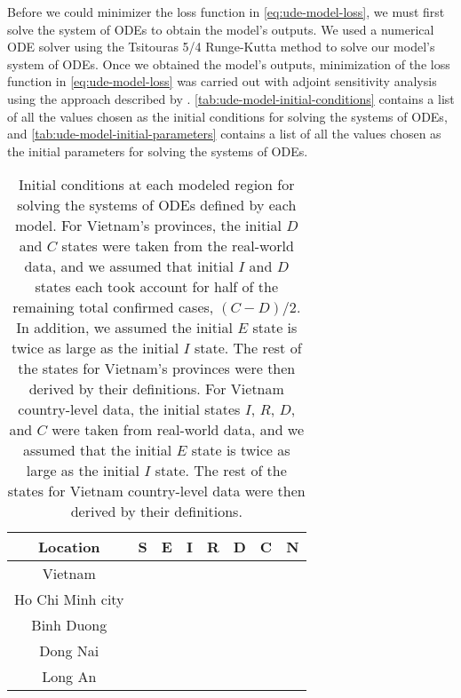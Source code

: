 Before we could minimizer the loss function in \autoref{eq:ude-model-loss}, we must first solve the system of \glspl{ODE} to obtain the model's outputs.
We used a numerical \gls{ODE} solver using the Tsitouras 5/4 Runge-Kutta method \cite{tsitourasRungeKuttaPairs2011} to solve our model's system of \glspl{ODE}.
Once we obtained the model's outputs, minimization of the loss function in \autoref{eq:ude-model-loss} was carried out with adjoint sensitivity analysis \cite{maComparisonAutomaticDifferentiation2021} using the approach described by \citeauthor{rackauckasUniversalDifferentialEquations2020} \cite{rackauckasUniversalDifferentialEquations2020}.
\autoref{tab:ude-model-initial-conditions} contains a list of all the values chosen as the initial conditions for solving the systems of \glspl{ODE}, and \autoref{tab:ude-model-initial-parameters} contains a list of all the values chosen as the initial parameters for solving the systems of \glspl{ODE}.

\begin{table}[h]
    \centering
    \begin{tabular}{| c | c | c | c | c | c | c | c |}
        Location & S & E & I & R & D & C & N \\
        \hline\hline
        Vietnam \\
        \hline
        Ho Chi Minh city \\
        \hline
        Binh Duong \\
        \hline
        Dong Nai \\
        \hline
        Long An \\
        \hline
    \end{tabular}
    \caption{Initial conditions at each modeled region for solving the systems of \glspl{ODE} defined by each model. For Vietnam's provinces, the initial $D$ and $C$ states were taken from the real-world data, and we assumed that initial $I$ and $D$ states each took account for half of the remaining total confirmed cases, $(C - D) / 2$. In addition, we assumed the initial $E$ state is twice as large as the initial $I$ state. The rest of the states for Vietnam's provinces were then derived by their definitions. For Vietnam country-level data, the initial states $I$, $R$, $D$, and $C$ were taken from real-world data, and we assumed that the initial $E$ state is twice as large as the initial $I$ state. The rest of the states for Vietnam country-level data were then derived by their definitions.}
    \label{tab:ude-model-initial-conditions}
\end{table}

